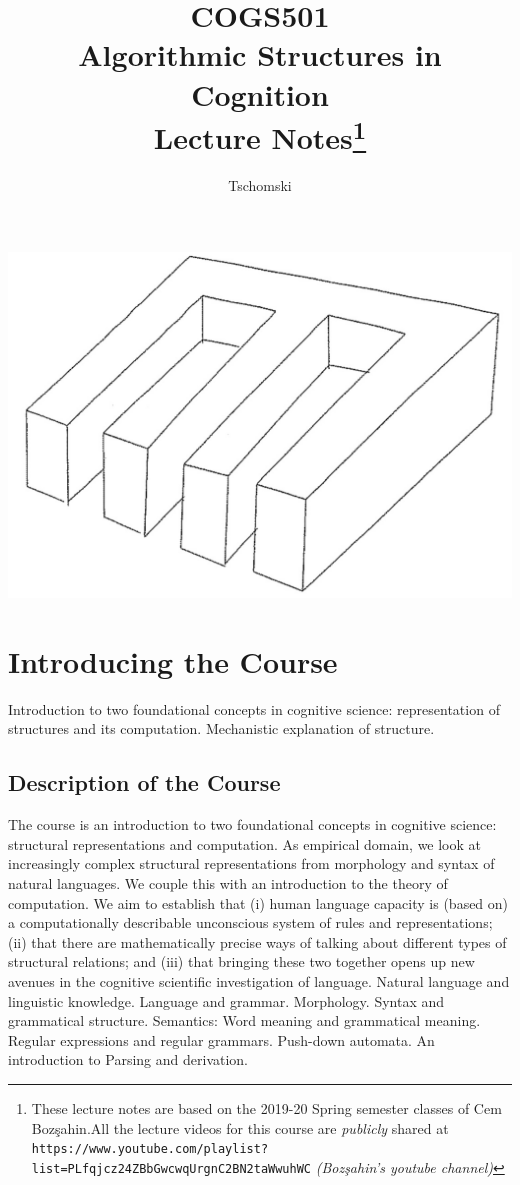 \documentclass[12pt,a4paper]{article}
\author{Tschomski}
\title{COGS501\\ Algorithmic Structures in Cognition\\ Lecture Notes\footnote{These lecture notes are based on the 2019-20 Spring semester classes of Cem Bozşahin.All the lecture videos for this course are \emph{publicly} shared at \texttt{https://www.youtube.com/playlist?list=PLfqjcz24ZBbGwcwqUrgnC2BN2taWwuhWC} \emph{(Bozşahin's youtube channel)}}}
\begin{document}
\maketitle
\vspace{2cm}
\begin{center}
\includegraphics[scale=0.6]{m.jpg}
\end{center}

\clearpage
\tableofcontents

\clearpage
\section{Introducing the Course}
Introduction to two foundational concepts in cognitive science: representation of structures and its computation. Mechanistic explanation of structure.

\subsection{Description of the Course}
The course is an introduction to two foundational concepts in cognitive science: structural representations and computation. As empirical domain, we look at increasingly complex structural representations from morphology and syntax of natural languages. We couple this with an introduction to the theory of computation. We aim to establish that (i) human language capacity is (based on) a computationally describable unconscious system of rules and representations; (ii) that there are mathematically precise ways of talking about different types of structural relations; and (iii) that bringing these two together opens up new avenues in the cognitive scientific investigation of language. Natural language and linguistic knowledge. Language and grammar. Morphology. Syntax and grammatical structure. Semantics: Word meaning and grammatical meaning. Regular expressions and regular grammars. Push-down automata. An introduction to Parsing and derivation.
\end{document}
